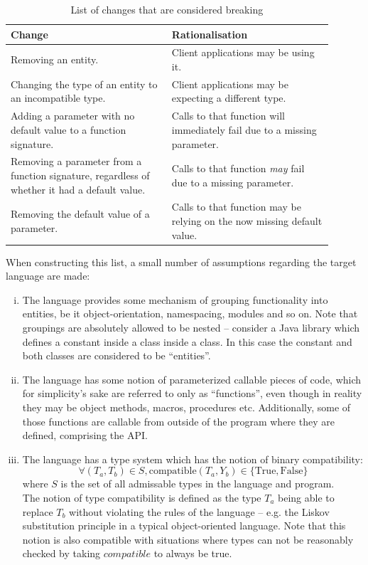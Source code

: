 \documentclass{l4proj}
\begin{document}
\begin{table}[H]
\centering
\caption{List of changes that are considered breaking}
\begin{tabular}{|p{0.45\linewidth}|p{0.45\linewidth}|}
\hline
\textbf{Change} & \textbf{Rationalisation} \\
\hline
Removing an entity. & Client applications may be using it. \\
\hline
Changing the type of an entity to an incompatible type.
& Client applications may be expecting a different type. \\
\hline
Adding a parameter with no default value to a function signature.
& Calls to that function will immediately fail due to a missing parameter. \\
\hline
Removing a parameter from a function signature,
regardless of whether it had a default value.
& Calls to that function \textit{may} fail due to a missing parameter. \\
\hline
Removing the default value of a parameter.
& Calls to that function may be relying on the now missing default value. \\
\hline
\end{tabular}
\end{table}

When constructing this list, a small number of assumptions
regarding the target language are made:

\begin{enumerate}[(i)]
\item The language provides some mechanism of grouping functionality
into entities, be it object-orientation, namespacing, modules and so
on. Note that groupings are absolutely allowed to be nested --
consider a Java library which defines a constant inside a class inside
a class. In this case the constant and both classes are considered to
be ``entities''.
\item The language has some notion of parameterized callable pieces of
code, which for simplicity's sake are referred to only as ``functions'',
even though in reality they may be object methods, macros, procedures etc.
Additionally, some of those functions are callable from outside of the
program where they are defined, comprising the API.
\label{SecondAssumption}
\item The language has a type system which has the notion of binary
compatibility:
\begin{equation}
\forall(T_a,T_b) \in S, \mathrm{compatible}(T_a,Y_b) \in
\{\mathrm{True},\mathrm{False}\}
\end{equation}
where $S$ is the set of all admissable types in the language and
program. \\

The notion of type compatibility is defined as the type $T_a$ being able
to replace $T_b$ without violating the rules of the language -- e.g. the
Liskov substitution principle \cite{Liskov} in a typical
object-oriented language. Note that this notion is also compatible
with situations where types can not be reasonably checked by taking
$compatible$ to always be true.
\end{enumerate}
\end{document}
